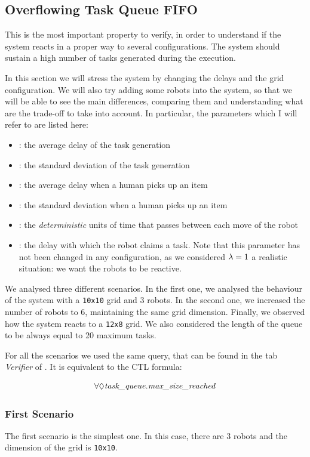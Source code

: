 \subsection{Overflowing Task Queue FIFO}
This is the most important property to verify, in order to understand if the system reacts in a proper way to several configurations. The system should sustain a high number of tasks generated during the execution.

In this section we will stress the system by changing the delays and the grid configuration. We will also try adding some robots into the system, so that we will be able to see the main differences, comparing them and understanding what are the trade-off to take into account. In particular, the parameters which I will refer to are listed here:
\begin{itemize}
    \item \mT: the average delay of the task generation
    \item \vT: the standard deviation of the task generation
    \item \mH: the average delay when a human picks up an item
    \item \vH: the standard deviation when a human picks up an item
    \item \K: the \emph{deterministic} units of time that passes between each move of the robot
    \item \expdel: the delay with which the robot claims a task. Note that this parameter has not been changed in any configuration, as we considered $\lambda= 1$ a realistic situation: we want the robots to be reactive.
\end{itemize}

We analysed three different scenarios. In the first one, we analysed the behaviour of the system with a \texttt{10x10} grid and 3 robots. In the second one, we increased the number of robots to 6, maintaining the same grid dimension. Finally, we observed how the system reacts to a \texttt{12x8} grid. We also considered the length of the queue to be always equal to 20 maximum tasks.

For all the scenarios we used the same query, that can be found in the tab \emph{Verifier} of \UPPAAL. It is equivalent to the CTL formula:

\begin{equation}
    \forall \lozenge \text{\emph{task\_queue.max\_size\_reached}}
\end{equation}

\subsubsection{First Scenario} \label{firstscenario}
The first scenario is the simplest one. In this case, there are 3 robots and the dimension of the grid is \texttt{10x10}.


